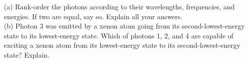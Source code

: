 (a) Rank-order the photons according to their wavelengths,
frequencies, and energies. If two are equal, say so.
Explain all your answers.\\
(b) Photon 3 was emitted by a xenon atom going from its
second-lowest-energy state to its lowest-energy state.
Which of photons 1, 2, and 4 are capable of exciting a
xenon atom from its lowest-energy state to its
second-lowest-energy state? Explain.
